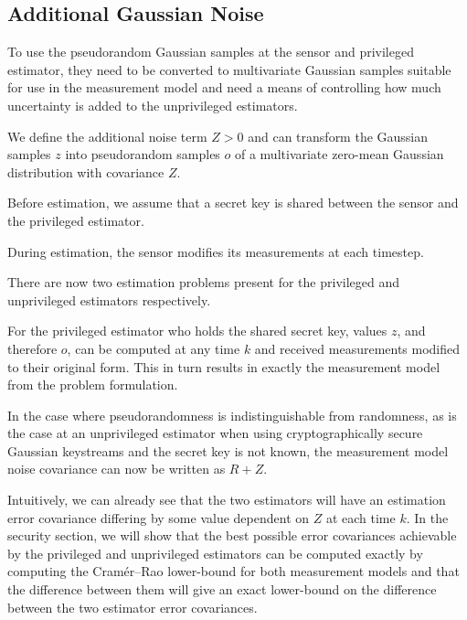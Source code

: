\documentclass[conference]{IEEEtran}
\theoremstyle{definition}
\theoremstyle{definition}
\theoremstyle{remark}
\begin{document}
% 
% 

\subsection{Additional Gaussian Noise}
To use the pseudorandom Gaussian samples at the sensor and privileged estimator, they need to be converted to multivariate Gaussian samples suitable for use in the measurement model and need a means of controlling how much uncertainty is added to the unprivileged estimators.

We define the additional noise term $Z>0$ and can transform the Gaussian samples $z$ into pseudorandom samples $o$ of a multivariate zero-mean Gaussian distribution with covariance $Z$.

Before estimation, we assume that a secret key is shared between the sensor and the privileged estimator.

During estimation, the sensor modifies its measurements at each timestep.

There are now two estimation problems present for the privileged and unprivileged estimators respectively.

For the privileged estimator who holds the shared secret key, values $z$, and therefore $o$, can be computed at any time $k$ and received measurements modified to their original form. This in turn results in exactly the measurement model from the problem formulation.

In the case where pseudorandomness is indistinguishable from randomness, as is the case at an unprivileged estimator when using cryptographically secure Gaussian keystreams and the secret key is not known, the measurement model noise covariance can now be written as $R+Z$.

Intuitively, we can already see that the two estimators will have an estimation error covariance differing by some value dependent on $Z$ at each time $k$. In the security section, we will show that the best possible error covariances achievable by the privileged and unprivileged estimators can be computed exactly by computing the Cramér–Rao lower-bound for both measurement models and that the difference between them will give an exact lower-bound on the difference between the two estimator error covariances.
\end{document}
